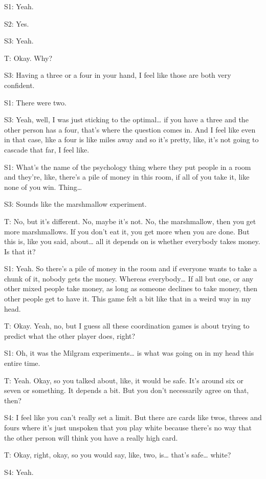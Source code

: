 S1: Yeah. 

S2: Yes. 

S3: Yeah. 

T: Okay. Why? 

S3: Having a three or a four in your hand, I feel like those are both very confident. 

S1: There were two.

S3: Yeah, well, I was just sticking to the optimal… if you have a three and the other person has a four, that's where the question comes in. And I feel like even in that case, like a four is like miles away and so it's pretty, like, it's not going to cascade that far, I feel like.  

S1: What's the name of the psychology thing where they put people in a room and they're, like, there's a pile of money in this room, if all of you take it, like none of you win. Thing…

S3: Sounds like the marshmallow experiment. 

T: No, but it's different. No, maybe it's not. No, the marshmallow, then you get more marshmallows. If you don't eat it, you get more when you are done. But this is, like you said, about… all it depends on is whether everybody takes money. Is that it? 

S1: Yeah. So there's a pile of money in the room and if everyone wants to take a chunk of it, nobody gets the money. Whereas everybody… If all but one, or any other mixed people take money, as long as someone declines to take money, then other people get to have it. This game felt a bit like that in a weird way in my head. 

T: Okay. Yeah, no, but I guess all these coordination games is about trying to predict what the other player does, right? 

S1: Oh, it was the Milgram experiments… is what was going on in my head this entire time.

T: Yeah. Okay, so you talked about, like, it would be safe. It's around six or seven or something. It depends a bit. But you don't necessarily agree on that, then?

S4: I feel like you can't really set a limit. But there are cards like twos, threes and fours where it's just unspoken that you play white because there's no way that the other person will think you have a really high card.

T: Okay, right, okay, so you would say, like, two, is… that's safe… white? 

S4: Yeah. 

